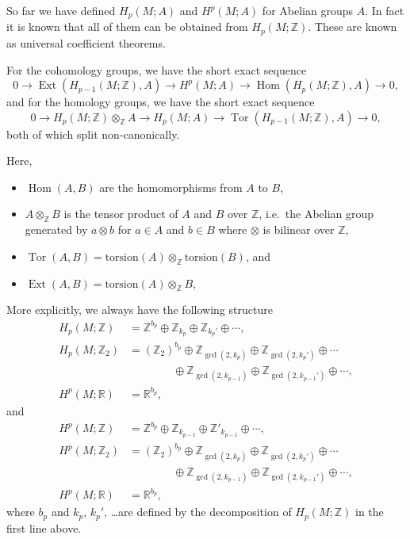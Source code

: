\documentclass[12pt]{article}
\numberwithin{equation}{section}
\theoremstyle{remark}
\def\bR{\mathbb{R}}
\def\bZ{\mathbb{Z}}
\def\Hom{\mathop{\mathrm{Hom}}}
\def\Ext{\mathop{\mathrm{Ext}}}
\def\Tor{\mathop{\mathrm{Tor}}}
\begin{document}
So far we have defined $H_p(M;A)$ and $H^p(M;A)$ for Abelian groups $A$.
In fact it is known that all of them can be obtained from $H_p(M;\bZ)$.
These are known as universal coefficient theorems.
\begin{theorem}
For the cohomology groups, we have the short exact sequence \begin{equation}
0\to \Ext(H_{p-1}(M;\bZ),A) \to H^p(M;A) \to \Hom(H_p(M;\bZ),A) \to 0,
\end{equation} and for the homology groups, we have the short exact sequence
\begin{equation}
  0\to H_p(M;\bZ)\otimes_\bZ A \to H_p(M;A) \to \Tor(H_{p-1}(M;\bZ),A) \to 0,
\end{equation}
both of which split non-canonically.
\end{theorem}
Here, 
\begin{itemize}
\item $\Hom(A,B)$ are the homomorphisms from $A$ to $B$,
\item $A\otimes_\bZ B$ is the tensor product of $A$ and $B$ over $\bZ$,
i.e.~the Abelian group generated by $a\otimes b$ for $a\in A$ and $b\in B$
where $\otimes$ is bilinear over $\bZ$,
\item $\Tor(A,B)=\text{torsion}(A)\otimes_\bZ \text{torsion}(B)$, and 
\item $\Ext(A,B)=\text{torsion}(A)\otimes_\bZ B$,
\end{itemize}
More explicitly, we always have the following structure \begin{align}
  H_p(M;\bZ) &= \bZ^{b_p} \oplus \bZ_{k_{p}} \oplus \bZ_{k_{p}'}\oplus \cdots,\\
H_p(M;\bZ_2)&= (\bZ_2)^{b_p}\oplus \bZ_{\gcd(2,k_{p})}\oplus \bZ_{\gcd(2,k_{p}')} \oplus \cdots\\
& \qquad \qquad \oplus \bZ_{\gcd(2,k_{p-1})}\oplus \bZ_{\gcd(2,k_{p-1}')} \oplus \cdots ,\\
H^p(M;\bR)&= \bR^{b_p},
\end{align} and \begin{align}
  H^p(M;\bZ)&= \bZ^{b_p} \oplus \bZ_{k_{p-1}}\oplus \bZ'_{k_{p-1}} \oplus \cdots,\\
H^p(M;\bZ_2)&= (\bZ_2)^{b_p}\oplus \bZ_{\gcd(2,k_{p})}\oplus \bZ_{\gcd(2,k_{p}')} \oplus \cdots\\
&\qquad \qquad \oplus \bZ_{\gcd(2,k_{p-1})}\oplus \bZ_{\gcd(2,k_{p-1}')} \oplus\cdots, \\
H^p(M;\bR)&= \bR^{b_p},
\end{align}
where $b_p$ and $k_p$, $k_p'$, \ldots are defined by the decomposition 
of $H_p(M;\bZ)$ in the first line above.
\end{document}
